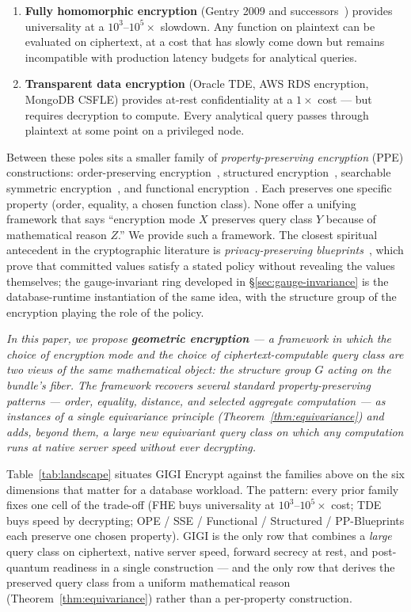 \documentclass[11pt,letterpaper]{article}
\begin{document}
\begin{enumerate}[nosep]
\item \textbf{Fully homomorphic encryption} (Gentry 2009 and
  successors~\cite{gentry2009fhe,bgv2012,ckks2017}) provides universality
  at a $10^3$--$10^5\times$ slowdown. Any function on plaintext can be
  evaluated on ciphertext, at a cost that has slowly come down but
  remains incompatible with production latency budgets for analytical
  queries.
\item \textbf{Transparent data encryption} (Oracle TDE, AWS RDS
  encryption, MongoDB CSFLE) provides at-rest confidentiality at a
  $1\times$ cost --- but requires decryption to compute. Every
  analytical query passes through plaintext at some point on a
  privileged node.
\end{enumerate}

Between these poles sits a smaller family of \emph{property-preserving
encryption} (PPE) constructions: order-preserving
encryption~\cite{boldyreva2009ope,popa2011cryptdb}, structured
encryption~\cite{chase2010structured}, searchable symmetric
encryption~\cite{curtmola2006sse}, and functional
encryption~\cite{boneh2011fe}. Each preserves one specific property
(order, equality, a chosen function class). None offer a unifying
framework that says ``encryption mode $X$ preserves query class $Y$
because of mathematical reason $Z$.'' We provide such a framework.
The closest spiritual antecedent in the cryptographic literature is
\emph{privacy-preserving blueprints}~\cite{kohlweiss2023blueprints},
which prove that committed values satisfy a stated policy without
revealing the values themselves; the gauge-invariant ring developed
in \S\ref{sec:gauge-invariance} is the database-runtime
instantiation of the same idea, with the structure group of the
encryption playing the role of the policy.

\emph{In this paper, we propose \textbf{geometric encryption} --- a
framework in which the choice of encryption mode and the choice of
ciphertext-computable query class are two views of the same
mathematical object: the structure group $G$ acting on the bundle's
fiber. The framework recovers several standard
property-preserving patterns --- order, equality, distance, and
selected aggregate computation --- as instances of a single
equivariance principle (Theorem~\ref{thm:equivariance}) and
adds, beyond them, a large new equivariant query class on which
any computation runs at native server speed without ever
decrypting.}

Table~\ref{tab:landscape} situates GIGI Encrypt against the
families above on the six dimensions that matter for a database
workload. The pattern: every prior family fixes one cell of the
trade-off (FHE buys universality at $10^3$--$10^5\times$ cost; TDE
buys speed by decrypting; OPE / SSE / Functional / Structured /
PP-Blueprints each preserve one chosen property). GIGI is the only
row that combines a \emph{large} query class on ciphertext, native
server speed, forward secrecy at rest, and post-quantum readiness
in a single construction --- and the only row that derives the
preserved query class from a uniform mathematical reason
(Theorem~\ref{thm:equivariance}) rather than a per-property
construction.
\end{document}
